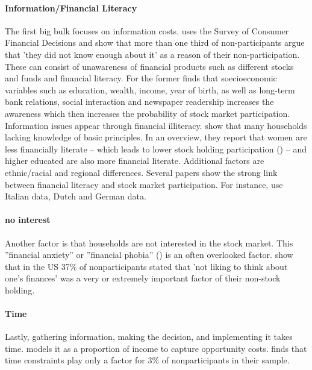 \documentclass[ProjectABM]{subfiles}
\begin{document}
\paragraph{Information/Financial Literacy}
The first big bulk focuses on information costs. \cite{king_leape_1987asset} uses the Survey of Consumer Financial Decisions and show that more than one third of non-participants argue that 'they did not know enough about it' as a reason of their non-participation. These can consist of unawareness of financial products such as different stocks and funds and financial literacy. For the former \cite{guiso_jappelli_2005} finds that soecioeconomic variables such as education, wealth, income, year of birth, as well as long-term bank relations, social interaction and newspaper readership increases the awareness which then increases the probability of stock market participation. Information issues appear through financial illiteracy. \cite{lusardi_mitchell_2011financial_literacy} show that many households lacking knowledge of basic principles. In an overview, they report that women are less financially literate -- which leads to lower stock holding participation (\cite{almenberg_2015gender}) -- and higher educated are also more financial literate. Additional factors are ethnic/racial and regional differences. Several papers show the strong link between financial literacy and stock market participation. For instance, \cite{guiso_japelli_2002household_book} use Italian data, \cite{hochguertel_et_al_2002household,vanrooij_et_al_2011} Dutch and \cite{borsch_eymann_2000household} German data.

\paragraph{no interest}
Another factor is that households are not interested in the stock market. This ''financial anxiety'' or ''financial phobia'' (\cite{shapiro_burchell_2012}) is an often overlooked factor. \cite{choi_2020} show that in the US 37\% of nonparticipants stated that 'not liking to think about one's finances' was a very or extremely important factor of their non-stock holding.

\paragraph{Time}
Lastly, gathering information, making the decision, and implementing it takes time. \cite{bonaparte_et_al_2012adjustment} models it as a proportion of income to capture opportunity costs. \cite{choi_2020} finds that time constraints play only a factor for 3\% of nonparticipants in their sample. %
\end{document}
